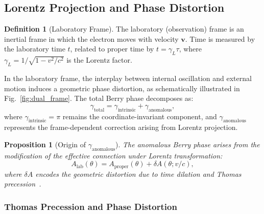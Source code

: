 \documentclass[%
 reprint,
 amsmath,amssymb,
 aps,
 prb,
]{revtex4-2}
\numberwithin{equation}{section}
\newtheorem{proposition}[theorem]{Proposition}
\theoremstyle{definition}
\newtheorem{definition}{Definition}[section]
\theoremstyle{remark}
\begin{document}
\subsection{Lorentz Projection and Phase Distortion}

\begin{definition}[Laboratory Frame]
The laboratory (observation) frame is an inertial frame in which the electron moves with velocity $\bm{v}$. Time is measured by the laboratory time $t$, related to proper time by $t = \gamma_L \tau$, where $\gamma_L = 1/\sqrt{1 - v^2/c^2}$ is the Lorentz factor.
\end{definition}

In the laboratory frame, the interplay between internal oscillation and external motion induces a geometric phase distortion, as schematically illustrated in Fig.~\ref{fig:dual_frame}. The total Berry phase decomposes as:
\begin{equation}
\gamma_{\text{total}} = \gamma_{\text{intrinsic}} + \gamma_{\text{anomalous}},
\label{eq:gamma_decomposition}
\end{equation}
where $\gamma_{\text{intrinsic}} = \pi$ remains the coordinate-invariant component, and $\gamma_{\text{anomalous}}$ represents the frame-dependent correction arising from Lorentz projection.

\begin{proposition}[Origin of $\gamma_{\text{anomalous}}$]
The anomalous Berry phase arises from the modification of the effective connection under Lorentz transformation:
\begin{equation}
A_{\text{lab}}(\theta) = A_{\text{proper}}(\theta) + \delta A(\theta; v/c),
\label{eq:connection_correction}
\end{equation}
where $\delta A$ encodes the geometric distortion due to time dilation and Thomas precession~\cite{Thomas1926}.
\end{proposition}

\subsubsection{Thomas Precession and Phase Distortion}
\label{sec:thomas}
\end{document}
